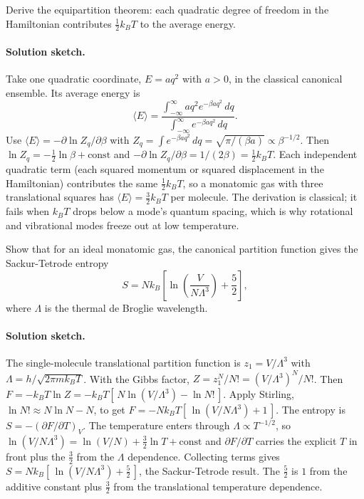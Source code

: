 \begin{exercise}
Derive the equipartition theorem: each quadratic degree of freedom in
the Hamiltonian contributes $\frac{1}{2} k_B T$ to the average
energy.

\paragraph{Solution sketch.} Take one quadratic coordinate, $E = a q^2$
with $a > 0$, in the classical canonical ensemble. Its average energy is
\[
\langle E \rangle = \frac{\int_{-\infty}^{\infty} a q^2
e^{-\beta a q^2}\,dq}{\int_{-\infty}^{\infty} e^{-\beta a q^2}\,dq}.
\]
Use $\langle E \rangle = -\partial \ln Z_q/\partial \beta$ with
$Z_q = \int e^{-\beta a q^2}\,dq = \sqrt{\pi/(\beta a)}
\propto \beta^{-1/2}$. Then $\ln Z_q = -\tfrac12 \ln \beta +
\text{const}$ and $-\partial \ln Z_q/\partial \beta = 1/(2\beta) =
\tfrac12 k_B T$. Each independent quadratic term (each squared momentum
or squared displacement in the Hamiltonian) contributes the same
$\tfrac12 k_B T$, so a monatomic gas with three translational squares
has $\langle E \rangle = \tfrac32 k_B T$ per molecule. The derivation is
classical; it fails when $k_B T$ drops below a mode's quantum spacing,
which is why rotational and vibrational modes freeze out at low
temperature.
\end{exercise}

\begin{exercise}
Show that for an ideal monatomic gas, the canonical partition
function gives the Sackur-Tetrode entropy
\[
S = N k_B \left[\ln \left(\frac{V}{N \Lambda^3}\right) +
\frac{5}{2}\right],
\]
where $\Lambda$ is the thermal de Broglie wavelength.

\paragraph{Solution sketch.} The single-molecule translational
partition function is $z_1 = V/\Lambda^3$ with
$\Lambda = h/\sqrt{2\pi m k_B T}$. With the Gibbs factor,
$Z = z_1^N/N! = (V/\Lambda^3)^N/N!$. Then
$F = -k_B T \ln Z = -k_B T[\,N \ln(V/\Lambda^3) - \ln N!\,]$. Apply
Stirling, $\ln N! \approx N \ln N - N$, to get
$F = -N k_B T[\,\ln(V/N\Lambda^3) + 1\,]$. The entropy is
$S = -(\partial F/\partial T)_V$. The temperature enters through
$\Lambda \propto T^{-1/2}$, so $\ln(V/N\Lambda^3) = \ln(V/N) +
\tfrac32 \ln T + \text{const}$ and
$\partial F/\partial T$ carries the explicit $T$ in front plus the
$\tfrac32$ from the $\Lambda$ dependence. Collecting terms gives
$S = N k_B[\,\ln(V/N\Lambda^3) + \tfrac52\,]$, the Sackur-Tetrode
result. The $\tfrac52$ is $1$ from the additive constant plus
$\tfrac32$ from the translational temperature dependence.
\end{exercise}

